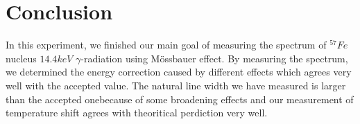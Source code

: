 \documentclass[aps,twocolumn,secnumarabic,balancelastpage,amsmath,amssymb,nofootinbib]{revtex4}
\begin{document}
\section{Conclusion}
In this experiment, we finished our main goal of measuring the spectrum of ${}^{57}Fe$ nucleus $14.4keV$ $\gamma$-radiation using M\"{o}ssbauer effect. By measuring the spectrum, we determined the energy correction caused by different effects which agrees very well with the accepted value. The natural line width we have measured is larger than the accepted onebecause of some broadening effects and our measurement of temperature shift agrees with theoritical perdiction very well.


\end{document}
